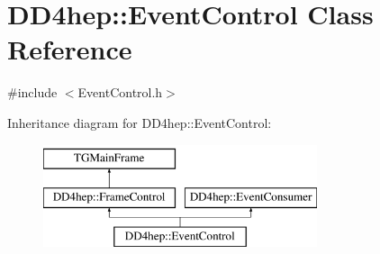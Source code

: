 \hypertarget{class_d_d4hep_1_1_event_control}{}\section{D\+D4hep\+:\+:Event\+Control Class Reference}
\label{class_d_d4hep_1_1_event_control}


{\ttfamily \#include $<$Event\+Control.\+h$>$}

Inheritance diagram for D\+D4hep\+:\+:Event\+Control\+:\begin{figure}[H]
\begin{center}
\leavevmode
\includegraphics[height=3.000000cm]{class_d_d4hep_1_1_event_control}
\end{center}
\end{figure}
